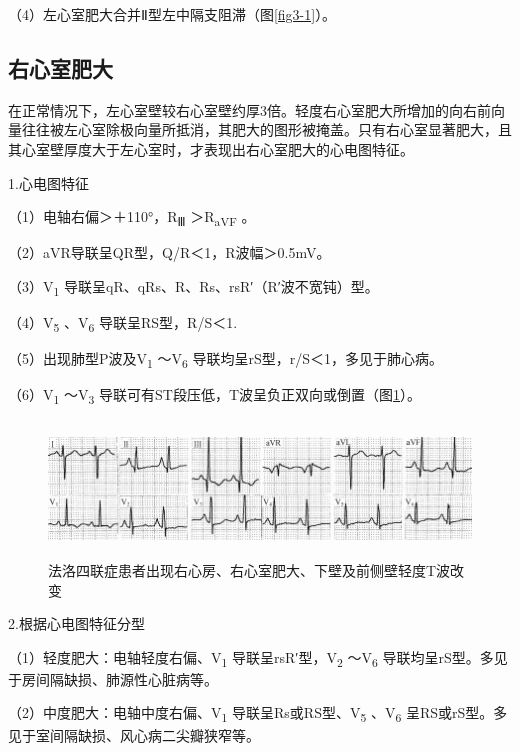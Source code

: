 （4）左心室肥大合并Ⅱ型左中隔支阻滞（图\ref{fig3-1}）。

\protect\hypertarget{text00009.htmlux5cux23subid41}{}{}

\subsection{右心室肥大}

在正常情况下，左心室壁较右心室壁约厚3倍。轻度右心室肥大所增加的向右前向量往往被左心室除极向量所抵消，其肥大的图形被掩盖。只有右心室显著肥大，且其心室壁厚度大于左心室时，才表现出右心室肥大的心电图特征。

1.心电图特征

（1）电轴右偏＞＋110°，R\textsubscript{Ⅲ} ＞R\textsubscript{aVF} 。

（2）aVR导联呈QR型，Q/R＜1，R波幅＞0.5mV。

（3）V\textsubscript{1} 导联呈qR、qRs、R、Rs、rsR′（R′波不宽钝）型。

（4）V\textsubscript{5} 、V\textsubscript{6} 导联呈RS型，R/S＜1.

（5）出现肺型P波及V\textsubscript{1} ～V\textsubscript{6}
导联均呈rS型，r/S＜1，多见于肺心病。

（6）V\textsubscript{1} ～V\textsubscript{3}
导联可有ST段压低，T波呈负正双向或倒置（图\ref{fig3-3}）。

\begin{figure}[!htbp]
 \centering
 \includegraphics[width=5.78125in,height=1.40625in]{./images/Image00052.jpg}
 \captionsetup{justification=centering}
 \caption{法洛四联症患者出现右心房、右心室肥大、下壁及前侧壁轻度T波改变}
 \label{fig3-3}
  \end{figure} 

2.根据心电图特征分型

（1）轻度肥大：电轴轻度右偏、V\textsubscript{1}
导联呈rsR′型，V\textsubscript{2} ～V\textsubscript{6}
导联均呈rS型。多见于房间隔缺损、肺源性心脏病等。

（2）中度肥大：电轴中度右偏、V\textsubscript{1}
导联呈Rs或RS型、V\textsubscript{5} 、V\textsubscript{6}
呈RS或rS型。多见于室间隔缺损、风心病二尖瓣狭窄等。

